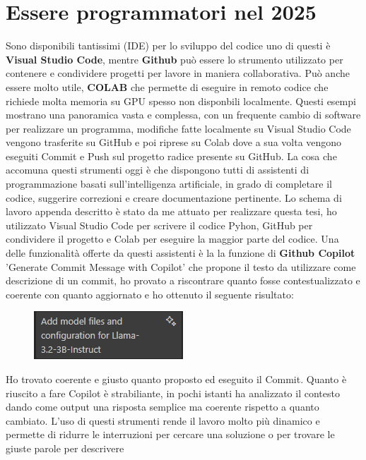 \documentclass[12pt,a4paper,openright,twoside]{book}
\begin{document}
\section{Essere programmatori nel 2025}
Sono disponibili tantissimi (IDE) per lo sviluppo del codice uno di questi è \textbf{Visual Studio Code}, mentre \textbf{Github} può essere lo strumento utilizzato per contenere e condividere progetti per lavore in maniera collaborativa. Può anche essere molto utile, \textbf{COLAB} che permette di eseguire in remoto codice che richiede molta memoria su GPU spesso non disponbili localmente.
Questi esempi mostrano una panoramica vasta e complessa, con un frequente cambio di software per realizzare un programma, modifiche fatte localmente su Visual Studio Code vengono trasferite su GitHub e poi riprese su Colab dove a sua volta vengono eseguiti Commit e Push sul progetto radice presente su GitHub.
La cosa che accomuna questi strumenti oggi è che dispongono tutti di assistenti di programmazione basati sull'intelligenza artificiale, in grado di completare il codice, suggerire correzioni e creare documentazione pertinente.
Lo schema di lavoro appenda descritto è stato da me attuato per realizzare questa tesi, ho utilizzato Visual Studio Code per scrivere il codice Pyhon, GitHub per condividere il progetto e Colab per eseguire la maggior parte del codice.
Una delle funzionalità offerte da questi assistenti è la la funzione di \textbf{Github Copilot} 'Generate Commit Message with Copilot' che propone il testo da utilizzare come descrizione di un commit, ho provato a riscontrare quanto fosse contestualizzato e coerente 
con quanto aggiornato e ho ottenuto il seguente risultato:
\begin{figure}[h]
    \centering
    \includegraphics[width=0.5\linewidth]{figures/commit.png}
    \label{fig:Commeit-Autogenerato}
\end{figure}
\newline
Ho trovato coerente e giusto quanto proposto ed eseguito il Commit.
Quanto è riuscito a fare Copilot è strabiliante, in pochi istanti ha analizzato il contesto dando come output una risposta semplice ma coerente rispetto a quanto cambiato.
L'uso di questi strumenti rende il lavoro molto più dinamico e permette di ridurre le interruzioni per cercare una soluzione o per trovare le giuste parole per descrivere
\end{document}
